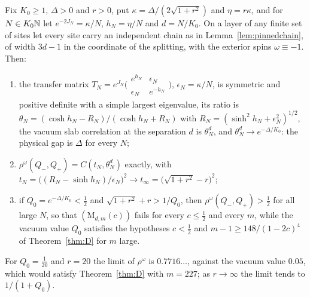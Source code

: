 \begin{proposition}
\label{prop:fieldrings}
Fix $K_0\ge1$, $\Delta>0$ and $r>0$, put $\kappa=\Delta/(2\sqrt{1+r^2})$
and $\eta=r\kappa$, and for $N\in K_0\mathbb{N}$ let $e^{-2J_N}=\kappa/N$, $h_N=
\eta/N$ and $d=N/K_0$. On a layer of any finite set of sites let every site
carry an independent chain as in Lemma~\textup{\ref{lem:pinnedchain}}, of
width $3d-1$ in the coordinate of the splitting, with the exterior spins
$\omega\equiv-1$. Then:
\begin{enumerate}[label=\textup{(\roman*)},leftmargin=*]
\item the transfer matrix $T_N=e^{J_N}\bigl(\begin{smallmatrix}e^{h_N}&\epsilon_N
\\\epsilon_N&e^{-h_N}\end{smallmatrix}\bigr)$, $\epsilon_N=\kappa/N$, is symmetric
and positive definite with a simple largest eigenvalue, its ratio is
$\theta_N=(\cosh h_N-R_N)/(\cosh h_N+R_N)$ with $R_N=(\sinh^2h_N+\epsilon_N^2
)^{1/2}$, the vacuum slab correlation at the separation $d$ is $\theta_N^d$,
and $\theta_N^d\to e^{-\Delta/K_0}$: the physical gap is $\Delta$ for every
$N$;
\item $\rho^\omega(Q_-,Q_+)=C(t_N,\theta_N^d)$ exactly, with $t_N=\bigl((R_N
-\sinh h_N)/\epsilon_N\bigr)^2\to t_\infty=\bigl(\sqrt{1+r^2}-r\bigr)^2$;
\item if $Q_0=e^{-\Delta/K_0}<\frac12$ and $\sqrt{1+r^2}+r>1/Q_0$, then
$\rho^\omega(Q_-,Q_+)>\frac12$ for all large $N$, so that $(\mathrm M_{d,m}
(c))$ fails for every $c\le\frac12$ and every $m$, while the vacuum value
$Q_0$ satisfies the hypotheses $c<\frac12$ and $m-1\ge148/(1-2c)^4$ of
Theorem~\textup{\ref{thm:D}} for $m$ large.
\end{enumerate}
For $Q_0=\frac1{20}$ and $r=20$ the limit of $\rho^\omega$ is $0.7716\ldots$,
against the vacuum value $0.05$, which would satisfy Theorem~\ref{thm:D}
with $m=227$; as $r\to\infty$ the limit tends to $1/(1+Q_0)$.
\end{proposition}

